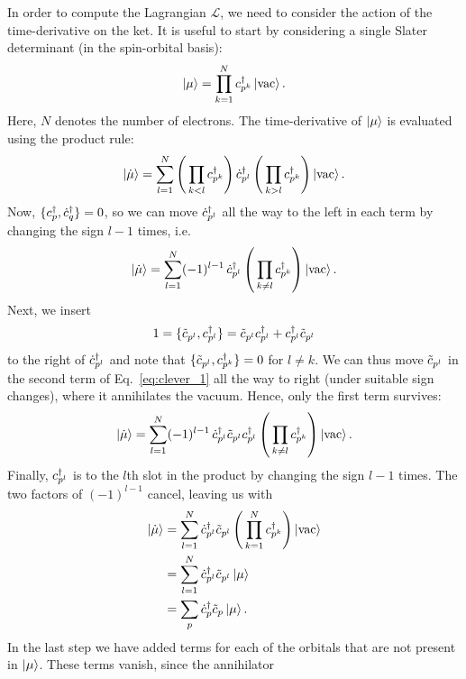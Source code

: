\documentclass[aip,jcp,preprint,superscriptaddress,nofootinbib]{revtex4-1}
\begin{document}
In order to compute the Lagrangian $\mathcal{L}$, we need to consider
the action of the time-derivative on the ket. It is useful to start by
considering a single Slater determinant (in the spin-orbital basis):
\begin{align}
    \ket{\mu} = \prod_{k=1}^N c^{\dagger}_{p^{\smash{k}}} \ket{\mathrm{vac}}.
\end{align}
Here, $N$ denotes the number of electrons. The time-derivative of
$\ket{\mu}$ is evaluated using the product rule:
\begin{align}
    \ket{\dot{\mu}} = \sum_{l=1}^{N} \left( \, \prod_{k < l} c^{\dagger}_{p^{\smash{k}}} \right) \dot{c}^{\dagger}_{p^{\smash{l}}} \left( \, \prod_{k > l} c^{\dagger}_{p^{\smash{k}}} \right) \ket{\mathrm{vac}}.
\end{align}
Now, $\{ c^{\dagger}_{p}, \dot{c}^{\dagger}_{q} \} = 0$, so we can move $\dot{c}^{\dagger}_{p^{\smash{l}}}$ all the way to the left in each term
by changing the sign $l - 1$ times, i.e.
\begin{align}
    \ket{\dot{\mu}} = \sum_{l=1}^{N} (-1)^{l-1} \, \dot{c}^{\dagger}_{p^{\smash{l}}} \left( \, \prod_{k \neq l} c^{\dagger}_{p^{\smash{k}}} \right) \ket{\mathrm{vac}}.
\end{align}
Next, we insert
\begin{align} \label{eq:clever_1}
    1 = \{ \tilde{c}_{{p}^{l}}, c^{\dagger}_{p^{\smash{l}}} \} = \tilde{c}_{{p}^{l}} c^{\dagger}_{p^{\smash{l}}} + c^{\dagger}_{p^{\smash{l}}} \tilde{c}_{{p}^{l}}
\end{align}
to the right of $\dot{c}^{\dagger}_{p^{\smash{l}}}$ and note that $\{ \tilde{c}_{{p}^{l}}, c^{\dagger}_{p^{\smash{k}}} \} = 0$ for $l \neq k$.
We can thus move $\tilde{c}_{{p}^{l}}$ in the second term of Eq.~\eqref{eq:clever_1} all the way to right
(under suitable sign changes), where it annihilates the vacuum. Hence, only the first term survives:
\begin{align}
    \ket{\dot{\mu}} = \sum_{l=1}^{N} (-1)^{l-1} \, \dot{c}^{\dagger}_{p^{\smash{l}}} \tilde{c}_{{p}^{l}} c^{\dagger}_{p^{\smash{l}}} \left( \, \prod_{k \neq l} c^{\dagger}_{p^{\smash{k}}} \right) \ket{\mathrm{vac}}.
\end{align}
Finally, $c^{\dagger}_{p^{\smash{l}}}$ is to the $l$th slot in the product by changing the sign $l - 1$ times.
The two factors of $(-1)^{l-1}$ cancel, leaving us with
\begin{align}
    \ket{\dot{\mu}} 
    &= \sum_{l=1}^{N}  \dot{c}^{\dagger}_{p^{\smash{l}}} \tilde{c}_{{p}^{l}}  \left( \, \prod_{k=1}^{N} c^{\dagger}_{p^{\smash{k}}} \right) \ket{\mathrm{vac}} \nonumber\\
    &= \sum_{l=1}^{N}  \dot{c}^{\dagger}_{p^{\smash{l}}} \tilde{c}_{{p}^{l}}  \ket{\mu} \nonumber\\
    &= \sum_{p}        \dot{c}^{\dagger}_{p} \tilde{c}_{p} \ket{\mu}.
\end{align}
In the last step we have added terms for each of the orbitals that are not present in $\ket{\mu}$. These terms vanish, since the annihilator
\end{document}
